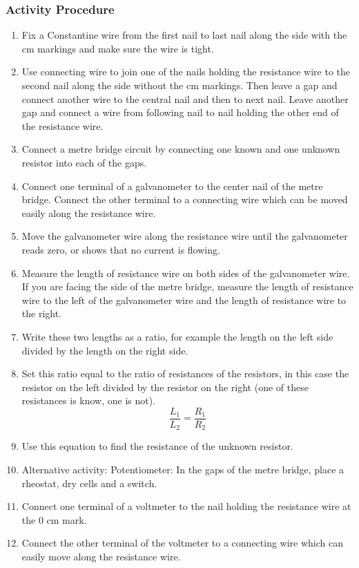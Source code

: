 \subsubsection*{Activity Procedure}
\begin{enumerate}
\item{Fix a Constantine wire from the first nail to last nail along the side with the cm markings and make sure the wire is tight.} 
\item{Use connecting wire to join one of the nails holding the resistance wire to the second nail along the side without the cm markings. Then leave a gap and connect another wire to the central nail and then to next nail. Leave another gap and connect a wire from following nail to nail holding the other end of the resistance wire.} 
\item{Connect a metre bridge circuit by connecting one known and one unknown resistor into each of the gaps.} 
\item{Connect one terminal of a galvanometer to the center nail of the metre bridge. Connect the other terminal to a connecting wire which can be moved easily along the resistance wire.} 
\item{Move the galvanometer wire along the resistance wire until the galvanometer reads zero, or shows that no current is flowing.} 
\item{Measure the length of resistance wire on both sides of the galvanometer wire. If you are facing the side of the metre bridge, measure the length of resistance wire to the left of the galvanometer wire and the length of resistance wire to the right.} 
\item{Write these two lengths as a ratio, for example the length on the left side divided by the length on the right side.} 
\item{Set this ratio equal to the ratio of resistances of the resistors, in this case the resistor on the left divided by the resistor on the right (one of these resistances is know, one is not).
$$ \frac{L_1}{L_2} = \frac{R_1}{R_2} $$ 
}
\item{Use this equation to find the resistance of the unknown resistor.} 
\item{Alternative activity: Potentiometer: In the gaps of the metre bridge, place a rheostat, dry cells and a switch.} 
\item{Connect one terminal of a voltmeter to the nail holding the resistance wire at the 0 cm mark.} 
\item{Connect the other terminal of the voltmeter to a connecting wire which can easily move along the resistance wire.} 

\end{enumerate}
